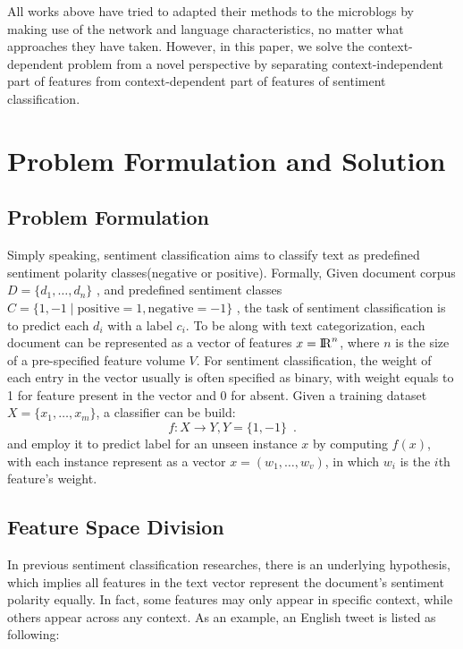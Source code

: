 \documentclass{llncs}
\begin{document}
All works above have tried to adapted their methods to the microblogs by making use of the network and language characteristics, no matter what approaches they have taken. However, in this paper, we solve the context-dependent problem from a novel perspective by separating context-independent part of features from context-dependent part of features of sentiment classification.
\section{Problem Formulation and Solution}
\label{problem}
\subsection{Problem Formulation}
\label{formulation}
Simply speaking, sentiment classification aims to classify text as predefined sentiment polarity classes(negative or positive).  
Formally, Given document corpus $ D=\lbrace d_{1},\dots ,d_{n} \rbrace$ , and predefined sentiment classes $ C=\lbrace 1,-1\mid \mathrm{positive}=1,\mathrm{negative}=-1 \rbrace$ , the task of sentiment classification is to predict each $ d_{i} $ with a label $ c_{i} $. 
To be along with text categorization, each document can be represented as a vector of features $ x={\rm I\!R}^{n} $, where $ n $ is the size of a pre-specified feature volume $ V $. 
For sentiment classification, the weight of each entry in the vector usually is often specified as binary, with weight equals to 1 for feature present in the vector and 0 for absent. 
Given a training dataset $ X=\lbrace x_{1},\dots,x_{m} \rbrace $, a classifier can be build:
\begin{equation}
  f:X \longrightarrow Y, Y=\lbrace 1,-1 \rbrace \enspace .
\end{equation} 
and employ it to predict label for an unseen instance $ x $ by computing $ f \left( x \right)   $, with each instance represent as a vector $ x=\left( w_{1},\dots,w_{v} \right)  $, in which $ w_{i} $ is the $ i $th feature’s weight.
\subsection{Feature Space Division}
\label{division}
In previous sentiment classification researches, there is an underlying hypothesis, which implies all features in the text vector represent the document’s sentiment polarity equally. 
In fact, some features may only appear in specific context, while others appear across any context. 
As an example, an English tweet is listed as following:
\end{document}
